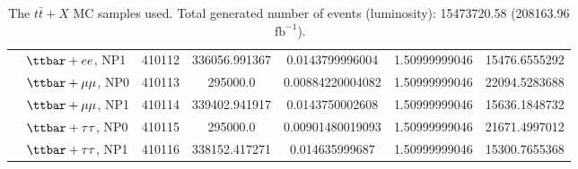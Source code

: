 \begin{table}[h]
\begin{center}
\begin{tabular}{|l|l|c|
S[table-parse-only, round-precision=4]|
S[table-parse-only, round-precision=3]|
S[table-parse-only, round-precision=3]|
S[table-parse-only, round-precision=3]|
}
 & $\ttbar+ee$, NP1 & 410112 & 336056.991367 & 0.0143799996004 & 1.50999999046 & 15476.6555292 \\
 & $\ttbar+\mu\mu$, NP0 & 410113 & 295000.0 & 0.00884220004082 & 1.50999999046 & 22094.5283688 \\
 & $\ttbar+\mu\mu$, NP1 & 410114 & 339402.941917 & 0.0143750002608 & 1.50999999046 & 15636.1848732 \\
 & $\ttbar+\tau\tau$, NP0 & 410115 & 295000.0 & 0.00901480019093 & 1.50999999046 & 21671.4997012 \\
 & $\ttbar+\tau\tau$, NP1 & 410116 & 338152.417271 & 0.014635999687 & 1.50999999046 & 15300.7655368 \\
\bottomrule
\end{tabular}
\caption{The $t\bar{t}+X$ MC samples used. Total generated number of events (luminosity): 15473720.58 (208163.96$~\mathrm{fb}^{-1}$).}
\label{tab:app:datamctopEW}
\end{center}
\end{table}
